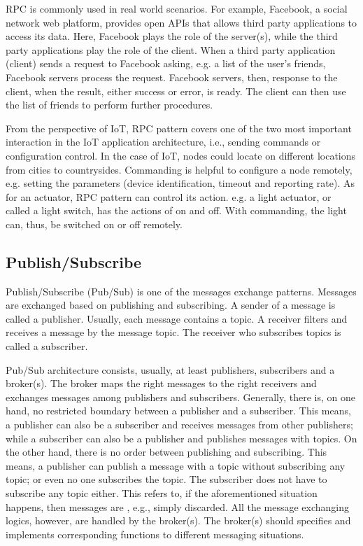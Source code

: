 RPC is commonly used in real world scenarios. For example, Facebook, a social network web platform, provides open APIs that allows third party applications to access its data. Here, Facebook plays the role of the server(s), while the third party applications play the role of the client. When a third party application (client) sends a request to Facebook asking, e.g. a list of the user's friends, Facebook servers process the request. Facebook servers, then, response to the client, when the result, either success or error, is ready. The client can then use the list of friends to perform further procedures. 

From the perspective of IoT, RPC pattern covers one of the two most important interaction in the IoT application architecture, i.e., sending commands or configuration control. In the case of IoT, nodes could locate on different locations from cities to countrysides. Commanding is helpful to configure a node remotely, e.g. setting the parameters (device identification, timeout and reporting rate). As for an actuator, RPC pattern can control its action. e.g. a light actuator, or called a light switch, has the actions of on and off. With commanding, the light can, thus, be switched on or off remotely.

\subsection{Publish/Subscribe}

Publish/Subscribe (Pub/Sub) is one of the messages exchange patterns. Messages are exchanged based on publishing and subscribing. A sender of a message is called a publisher. Usually, each message contains a topic. A receiver filters and receives a message by the message topic. The receiver who subscribes topics is called a subscriber. 

Pub/Sub architecture consists, usually, at least publishers, subscribers and a broker(s). The broker maps the right messages to the right receivers and exchanges messages among publishers and subscribers. Generally, there is, on one hand, no restricted boundary between a publisher and a subscriber. This means, a publisher can also be a subscriber and receives messages from other publishers; while a subscriber can also be a publisher and publishes messages with topics. On the other hand, there is no order between publishing and subscribing. This means, a publisher can publish a message with a topic without subscribing any topic; or even no one subscribes the topic. The subscriber does not have to subscribe any topic either. This refers to, if the aforementioned situation happens, then messages are , e.g., simply discarded. All the message exchanging logics, however, are handled by the broker(s). The broker(s) should specifies and implements corresponding functions to different messaging situations. 

